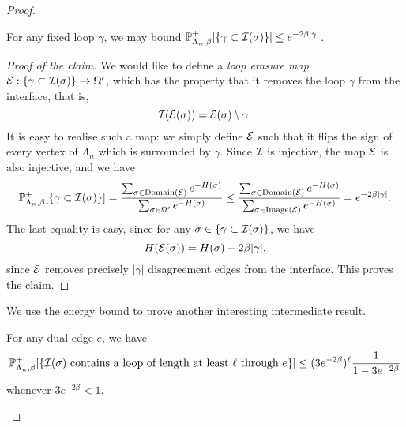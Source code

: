 \begin{proof}
    \begin{claim*}
        For any fixed loop $\gamma$, we may bound $\mathbb P_{\Lambda_n,\beta}^+[\{\gamma\subset\mathcal I(\sigma)\}]\leq e^{-2\beta|\gamma|}$.
    \end{claim*}

    \begin{proof}[Proof of the claim]
    We would like to define a \emph{loop erasure map} $\mathcal E:\{\gamma\subset\mathcal I(\sigma)\}\to\Omega'$,
    which has the property that it removes the loop $\gamma$ from the interface,
    that is,
    \[
        \mathcal I(\mathcal E(\sigma))=\mathcal E(\sigma)\setminus\gamma.
    \]
    It is easy to realise such a map: we simply define $\mathcal E$ such that it
    flips the sign of every vertex of $\Lambda_n$ which is surrounded by $\gamma$.
    Since $\mathcal I$ is injective, the map $\mathcal E$ is also injective,
    and we have
    \[
        \mathbb P_{\Lambda_n,\beta}^+[\{\gamma\subset\mathcal I(\sigma)\}]
        =
        \frac
        {\sum_{\sigma\in\operatorname{Domain}(\mathcal E)}e^{-H(\sigma)}}
        {\sum_{\sigma\in\Omega'}e^{-H(\sigma)}}
        \leq
        \frac
        {\sum_{\sigma\in\operatorname{Domain}(\mathcal E)}e^{-H(\sigma)}}
        {\sum_{\sigma\in\operatorname{Image}(\mathcal E)}e^{-H(\sigma)}}
        =
        e^{-2\beta|\gamma|}.
    \]
    The last equality is easy,
    since for any $\sigma\in\{\gamma\subset\mathcal I(\sigma)\}$,
    we have
    \[
        H(\mathcal E(\sigma))=H(\sigma)-2\beta|\gamma|,
    \]
    since $\mathcal E$ removes precisely $|\gamma|$ disagreement edges from the interface.
    This proves the claim.
    \renewcommand{\qedsymbol}{}
    \end{proof}

    We use the energy bound to prove another interesting intermediate result.

    \begin{claim*}
        For any dual edge $e$, we have
        \[
        \P_{\Lambda_n,\beta}^+[\{\text{$\calI(\sigma)$ contains a loop of length at least $\ell$ through $e$}\}]
        \leq (3e^{-2\beta})^\ell \frac{1}{1-3e^{-2\beta}}
        \]
        whenever $3e^{-2\beta}<1$.
    \end{claim*}


\end{proof}
